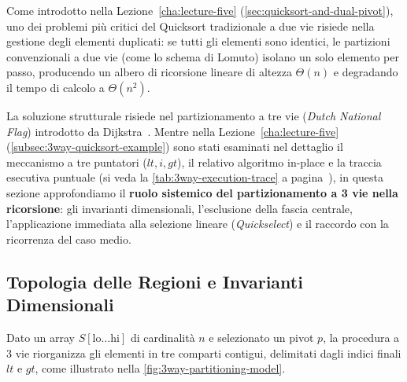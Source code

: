 Come introdotto nella Lezione~\ref{cha:lecture-five} (\autoref{sec:quicksort-and-dual-pivot}), uno dei problemi più critici del Quicksort tradizionale a due vie risiede nella gestione degli elementi duplicati: se tutti gli elementi sono identici, le partizioni convenzionali a due vie (come lo schema di Lomuto) isolano un solo elemento per passo, producendo un albero di ricorsione lineare di altezza $\Theta(n)$ e degradando il tempo di calcolo a $\Theta(n^2)$.

La soluzione strutturale risiede nel partizionamento a tre vie (\textit{Dutch National Flag}) introdotto da Dijkstra~\cite{dijkstra1976}. Mentre nella Lezione~\ref{cha:lecture-five} (\autoref{subsec:3way-quicksort-example}) sono stati esaminati nel dettaglio il meccanismo a tre puntatori ($lt, i, gt$), il relativo algoritmo in-place e la traccia esecutiva puntuale (si veda la \autoref{tab:3way-execution-trace} a pagina~\pageref{tab:3way-execution-trace}), in questa sezione approfondiamo il \textbf{ruolo sistemico del partizionamento a 3 vie nella ricorsione}: gli invarianti dimensionali, l'esclusione della fascia centrale, l'applicazione immediata alla selezione lineare (\textit{Quickselect}) e il raccordo con la ricorrenza del caso medio.

\subsection{Topologia delle Regioni e Invarianti Dimensionali}
\label{subsec:3way-invariants-dimensional}

Dato un array $S[\text{lo} \dots \text{hi}]$ di cardinalità $n$ e selezionato un pivot $p$, la procedura a 3 vie riorganizza gli elementi in tre comparti contigui, delimitati dagli indici finali $lt$ e $gt$, come illustrato nella \autoref{fig:3way-partitioning-model}.

